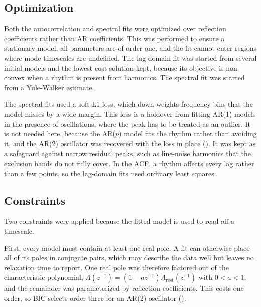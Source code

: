 \documentclass[pdflatex,sn-mathphys-num]{sn-jnl}
\begin{document}
\subsection{Optimization}

Both the autocorrelation and spectral fits were optimized over reflection coefficients rather than AR coefficients. This was performed to ensure a stationary model, all parameters are of order one, and the fit cannot enter regions where mode timescales are undefined. The lag-domain fit was started from several initial models and the lowest-cost solution kept, because its objective is non-convex when a rhythm is present from harmonics. The spectral fit was started from a Yule-Walker estimate.

The spectral fits used a soft-L1 loss, which down-weights frequency bins that the model misses by a wide margin. This loss is a holdover from fitting AR(1) models in the presence of oscillations, where the peak has to be treated as an outlier. It is not needed here, because the AR($p$) model fits the rhythm rather than avoiding it, and the AR(2) oscillator was recovered with the loss in place (). It was kept as a safeguard against narrow residual peaks, such as line-noise harmonics that the exclusion bands do not fully cover. In the ACF, a rhythm affects every lag rather than a few points, so the lag-domain fits used ordinary least squares.

\subsection{Constraints}

Two constraints were applied because the fitted model is used to read off a timescale.

First, every model must contain at least one real pole. A fit can otherwise place all of its poles in conjugate pairs, which may describe the data well but leaves no relaxation time to report. One real pole was therefore factored out of the characteristic polynomial, $A(z^{-1}) = (1 - a z^{-1})A_{\mathrm{rest}}(z^{-1})$ with $0 < a < 1$, and the remainder was parameterized by reflection coefficients. This costs one order, so BIC selects order three for an AR(2) oscillator ().
\end{document}
